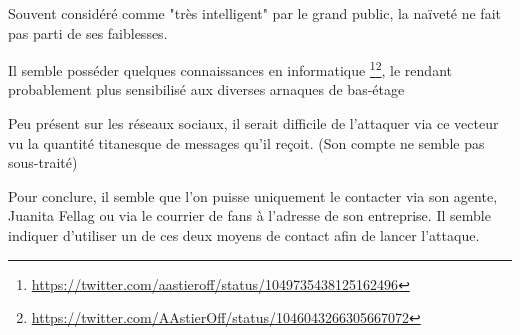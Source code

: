 Souvent considéré comme "très intelligent" par le grand public, la naïveté ne fait pas parti de ses faiblesses.

Il semble posséder quelques connaissances en informatique \footnote{\url{https://twitter.com/aastieroff/status/1049735438125162496}}\footnote{\url{https://twitter.com/AAstierOff/status/1046043266305667072}}, le rendant probablement plus sensibilisé aux diverses arnaques de bas-étage

Peu présent sur les réseaux sociaux, il serait difficile de l'attaquer via ce vecteur vu la quantité titanesque de messages qu'il reçoit. (Son compte ne semble pas sous-traité)

Pour conclure, il semble que l'on puisse uniquement le contacter via son agente, Juanita Fellag ou via le courrier de fans à l'adresse de son entreprise. Il semble indiquer d'utiliser un de ces deux moyens de contact afin de lancer l'attaque.
